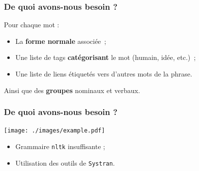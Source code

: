 \documentclass[12pt]{beamer}
\begin{document}
%  

%  
%  


\begin{frame}
 \frametitle{De quoi avons-nous besoin ?}
 
 Pour chaque mot :
  \begin{itemize}
  \item La \textbf{forme normale} associée~;
  \item Une liste de tags \textbf{catégorisant} le mot (humain, idée, etc.)~;
  \item Une liste de liens étiquetés vers d'autres mots de la phrase.
 \end{itemize}
 
 Ainsi que des \textbf{groupes} nominaux et verbaux.
 

\end{frame}

\begin{frame}
 \frametitle{De quoi avons-nous besoin ?}
 
  \texttt{[image: ./images/example.pdf]}
 
 \pause
 
 \begin{itemize}
  \item Grammaire \texttt{nltk} insuffisante ;
  \item Utilisation des outils de \texttt{Systran}.
 \end{itemize} 
 
 
\end{frame}
\end{document}
